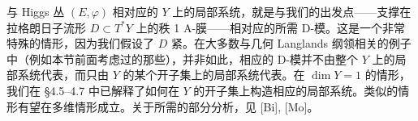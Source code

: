 与 Higgs 丛 $(E,\varphi)$ 相对应的 $Y$ 上的局部系统，就是与我们的出发点——支撑在拉格朗日子流形 $D\subset T^*Y$ 上的秩 1 A-膜——相对应的所需 D-模。这是一个非常特殊的情形，因为我们假设了 $D$ 紧。在大多数与几何 Langlands 纲领相关的例子中（例如本节前面考虑过的那些），并非如此，相应的 D-模并不由整个 $Y$ 上的局部系统代表，而只由 $Y$ 的某个开子集上的局部系统代表。在 $\dim Y=1$ 的情形，我们在 §4.5--4.7 中已解释了如何在 $Y$ 的开子集上构造相应的局部系统。类似的情形有望在多维情形成立。关于所需的部分分析，见 [Bi], [Mo]。

